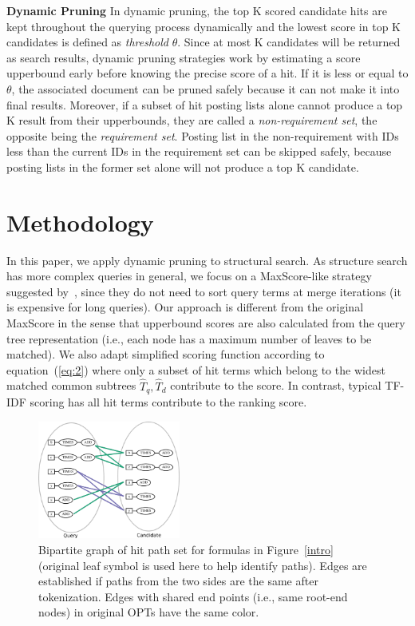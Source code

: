 \documentclass[runningheads]{llncs}
\begin{document}
\vspace{0.1in}
\noindent\textbf{Dynamic Pruning}\; In dynamic pruning, the top K scored candidate hits are kept throughout the querying process dynamically and the lowest score in top K candidates is defined as \textit{threshold} $\theta$. Since at most K candidates will be returned as search results, dynamic pruning strategies work by estimating a score upperbound early before knowing the precise score of a hit.
%
If it is less or equal to $\theta$, the associated document can be pruned safely because it can not make it into final results.
Moreover, if a subset of hit posting lists alone cannot produce a top K result from their upperbounds, they are called a \textit{non-requirement set}, the opposite being the \textit{requirement set}.
%
Posting list in the non-requirement with IDs less than the current IDs in the requirement set can be skipped safely, because posting lists in the former set alone will not produce a top K candidate.

\section{Methodology}
\label{strategy}
In this paper, we apply dynamic pruning to structural search.
As structure search has more complex queries in general, we focus on a MaxScore-like strategy suggested by~\cite{Shandongdong2012, antonio2019}, since they do not need to sort query terms at merge iterations (it is expensive for long queries).
%
Our approach is different from the original MaxScore in the sense that upperbound scores are also calculated from the query tree representation (i.e., each node has a maximum number of leaves to be matched).
We also adapt simplified scoring function according to equation~(\ref{eq:2})
where only a subset of hit terms which belong to the widest matched common subtrees $\hat{T}_q, \hat{T}_d$ contribute to the score.
In contrast, typical TF-IDF scoring has all hit terms contribute to the ranking score.

\begin{figure}[!t]
\begin{center}
\includegraphics[width=1.84in]{fig/bipartile.eps}
\caption{Bipartite graph of hit path set for formulas in Figure~\ref{intro} (original leaf symbol is used here to help identify paths). Edges are established if paths from the two sides are the same after tokenization. Edges with shared end points (i.e., same root-end nodes) in original OPTs have the same color. }
\label{bipart}
\end{center}
\end{figure}
\end{document}
